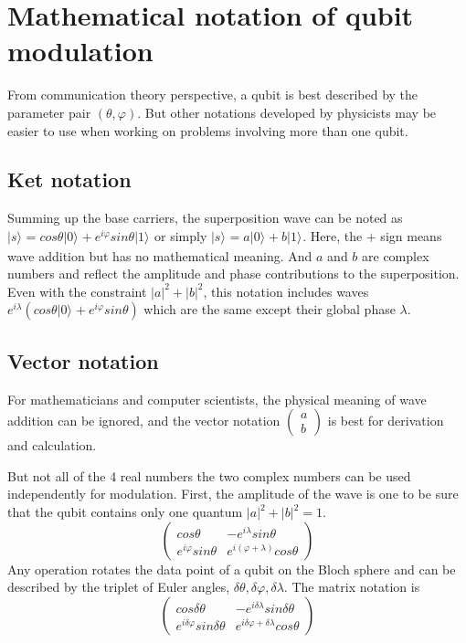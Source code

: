 \documentclass{book}
\newcommand{\keta}[2][]{\vert {#2} \rangle_{#1}}
\begin{document}
\section{Mathematical notation of qubit modulation}
From communication theory perspective, a qubit is best described by the parameter pair $(\theta, \varphi)$. But other notations developed by physicists may be easier to use when working on problems involving more than one qubit. 
\subsection{Ket notation}
Summing up the base carriers, the superposition wave can be noted as $\keta{s} = cos{\theta} \keta{0} + e^{i \varphi} sin{\theta} \keta{1}$ or simply $\keta{s} = a \keta{0} + b \keta{1}$. Here, the $+$ sign means wave addition but has no mathematical meaning. And $a$ and $b$ are complex numbers and reflect the amplitude and phase contributions to the superposition. Even with the constraint $|a|^2+ |b|^2$, this notation includes waves $e^{i\lambda} (cos{\theta} \keta{0} + e^{i \varphi} sin{\theta})$ which are the same except their global phase $\lambda$.

\subsection{Vector notation}
For mathematicians and computer scientists, the physical meaning of wave addition can be ignored, and the vector notation $
\begin{pmatrix}
    a \\
    b
\end{pmatrix}$ is best for derivation and calculation.

But not all of the 4 real numbers the two complex numbers can be used independently for modulation. First, the amplitude of the wave is one to be sure that the qubit contains only one quantum $|a|^2 + |b|^2 = 1$.
\begin{equation}
    \begin{pmatrix}
    cos\theta & -e^{i\lambda} sin\theta \\
    e^{i\varphi} sin\theta & e^{i(\varphi + \lambda)} cos\theta
\end{pmatrix}
\end{equation}
Any operation rotates the data point of a qubit on the Bloch sphere and can be described by the triplet of Euler angles, $\delta \theta, \delta \varphi, \delta \lambda$. The matrix notation is
\begin{equation}
    \begin{pmatrix}
        cos\delta \theta & -e^{i\delta \lambda} sin\delta \theta \\
        e^{i \delta \varphi} sin\delta \theta & e^{i \delta \varphi+ \delta \lambda} cos\theta 
    \end{pmatrix}
\end{equation}
\end{document}
